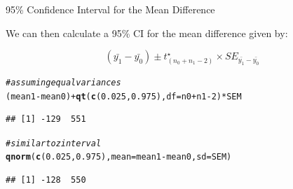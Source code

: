 \documentclass[10pt]{beamer}\usepackage[]{graphicx}\usepackage[]{color}
\makeatletter
\newcommand{\hlnum}[1]{\textcolor[rgb]{0.686,0.059,0.569}{#1}}%
\newcommand{\hlcom}[1]{\textcolor[rgb]{0.678,0.584,0.686}{\textit{#1}}}%
\newcommand{\hlopt}[1]{\textcolor[rgb]{0,0,0}{#1}}%
\newcommand{\hlstd}[1]{\textcolor[rgb]{0.345,0.345,0.345}{#1}}%
\newcommand{\hlkwc}[1]{\textcolor[rgb]{0.333,0.667,0.333}{#1}}%
\newcommand{\hlkwd}[1]{\textcolor[rgb]{0.737,0.353,0.396}{\textbf{#1}}}%
\newenvironment{kframe}{%
 \def\at@end@of@kframe{}%
 \ifinner\ifhmode%
  \def\at@end@of@kframe{\end{minipage}}%
  \begin{minipage}{\columnwidth}%
 \fi\fi%
 \def\FrameCommand##1{\hskip\@totalleftmargin \hskip-\fboxsep
 \colorbox{shadecolor}{##1}\hskip-\fboxsep
     \hskip-\linewidth \hskip-\@totalleftmargin \hskip\columnwidth}%
 \MakeFramed {\advance\hsize-\width
   \@totalleftmargin\z@ \linewidth\hsize
   \@setminipage}}%
 {\par\unskip\endMakeFramed%
 \at@end@of@kframe}
\newenvironment{knitrout}{}{} %
\makeatother
\begin{document}
\begin{frame}[fragile]{95\% Confidence Interval for the Mean Difference}
	
	We can then calculate a 95\% CI for the mean difference given by:
	
	\begin{equation}
		(\bar{y_1} - \bar{y_0}) \pm t^\star_{(n_0 + n_1 - 2)} \times SE_{\bar{y_1} - \bar{y_0}}
	\end{equation}
	
	\pause 
	
\begin{knitrout}\scriptsize
{}\color{fgcolor}\begin{kframe}
\begin{alltt}
\hlcom{# assuming equal variances}
\hlstd{(mean1} \hlopt{-} \hlstd{mean0)} \hlopt{+} \hlkwd{qt}\hlstd{(}\hlkwd{c}\hlstd{(}\hlnum{0.025}\hlstd{,} \hlnum{0.975}\hlstd{),} \hlkwc{df} \hlstd{= n0} \hlopt{+} \hlstd{n1} \hlopt{-} \hlnum{2}\hlstd{)} \hlopt{*} \hlstd{SEM}
\end{alltt}
\begin{verbatim}
## [1] -129  551
\end{verbatim}
\begin{alltt}
\hlcom{# similar to z interval}
\hlkwd{qnorm}\hlstd{(}\hlkwd{c}\hlstd{(}\hlnum{0.025}\hlstd{,} \hlnum{0.975}\hlstd{),} \hlkwc{mean} \hlstd{= mean1} \hlopt{-} \hlstd{mean0,} \hlkwc{sd} \hlstd{= SEM)}
\end{alltt}
\begin{verbatim}
## [1] -128  550
\end{verbatim}
\end{kframe}
\end{knitrout}
	
	
\end{frame}
\end{document}
